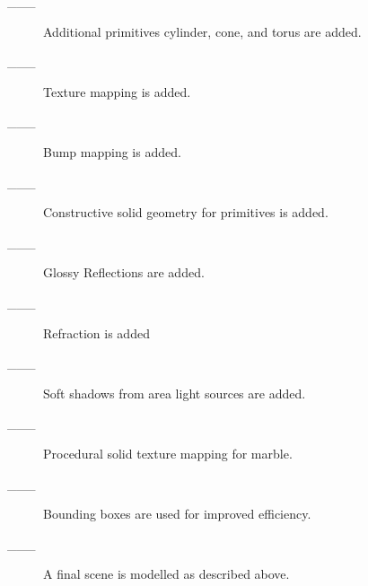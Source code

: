 \documentclass {article}
\begin{document}
\begin{description}
     \item[\_\_\_]  Additional primitives cylinder, cone, and torus are added.

     \item[\_\_\_]  Texture mapping is added.

     \item[\_\_\_]  Bump mapping is added.

     \item[\_\_\_]  Constructive solid geometry for primitives is added.

     \item[\_\_\_]  Glossy Reflections are added.

     \item[\_\_\_]  Refraction is added

     \item[\_\_\_]  Soft shadows from area light sources are added.

     \item[\_\_\_]  Procedural solid texture mapping for marble.

     \item[\_\_\_]  Bounding boxes are used for improved efficiency.

     \item[\_\_\_]  A final scene is modelled as described above.
\end{description}
\end{document}
